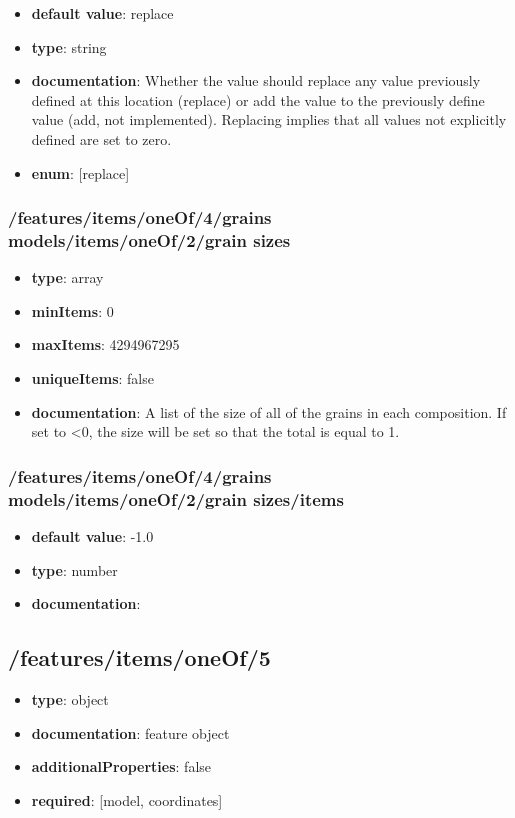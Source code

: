 \begin{itemize}\item {\bf default value}: replace
\item {\bf type}: string
\item {\bf documentation}: Whether the value should replace any value previously defined at this location (replace) or add the value to the previously define value (add, not implemented). Replacing implies that all values not explicitly defined are set to zero.
\item {\bf enum}: [replace]\end{itemize}\subsubsection{/features/items/oneOf/4/grains models/items/oneOf/2/grain sizes}
\begin{itemize}\item {\bf type}: array
\item {\bf minItems}: 0
\item {\bf maxItems}: 4294967295
\item {\bf uniqueItems}: false
\item {\bf documentation}: A list of the size of all of the grains in each composition. If set to <0, the size will be set so that the total is equal to 1.
\end{itemize}\subsubsection{/features/items/oneOf/4/grains models/items/oneOf/2/grain sizes/items}
\begin{itemize}\item {\bf default value}: -1.0
\item {\bf type}: number
\item {\bf documentation}: 
\end{itemize}\subsection{/features/items/oneOf/5}
\begin{itemize}\item {\bf type}: object
\item {\bf documentation}: feature object
\item {\bf additionalProperties}: false
\item {\bf required}: [model, coordinates]\end{itemize}
